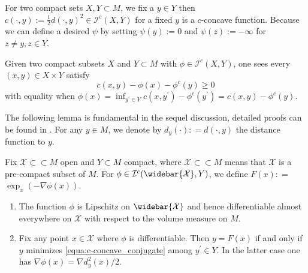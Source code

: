 \begin{example}
	\label{example:square_distance_c-concave}
	For two compact sets $X,Y \subset M$, we fix a $y \in Y$ then
	$c(\cdot, y):=\frac{1}{2}d(\cdot,y)^2 \in \mathcal{I}^c (X,Y)$ for a fixed $y$ is a $c$-concave function.
	Because we can define a desired $\psi$ by setting $\psi (y) := 0$ and $\psi (z) := - \infty$ for $ z \neq y, z \in Y$.
\end{example}

Given two compact subsets \( X \) and \( Y \subset M \) with \( \phi \in \mathcal { I } ^ { c } ( X , Y ) \),
one sees every \( ( x , y ) \in X \times Y \) satisfy
\begin{equation}
	\label{equa:c-concave_conjugate}
	c ( x , y ) - \phi ( x ) - \phi ^ { c } ( y ) \geq 0
\end{equation}
with equality when \( \phi ( x ) = \inf _ { y ^ { \prime } \in Y } c \left( x , y ^ { \prime } \right) - \phi ^ { c } \left( y ^ { \prime } \right) = c ( x , y ) - \phi ^ { c } ( y ) . \)

The following lemma \cite[Lemma 3.2]{cordero2001riemannian} is fundamental in the sequel discussion,
detailed proofs can be found in \cite[Lemmas 2 and 7]{mccann2001polar}.
For any \( y \in M \), we denote by \( d _ { y } ( \cdot ) : = d ( \cdot , y ) \)
the distance function to \( y \).
\begin{lem}
	\label{lem:minimizer_differentiable}
	Fix \( \mathcal{X} \subset \subset M \) open and \( Y \subset M \) compact,
	where $ \mathcal{X} \subset \subset M $ means that $\mathcal{X}$ is a pre-compact subset of $M$.
	For \( \phi \in \mathcal{I} ^ { c } ( \widebar { \mathcal{X} } , Y ) \), we define \( F ( x ) : = \)
	\( \exp _ { x } ( - \nabla \phi ( x ) ) \).
	\begin{enumerate}
		\item The function \( \phi \) is Lipschitz on \( \widebar { \mathcal{X} } \) and
		      hence differentiable almost everywhere on \( \mathcal{X} \) with respect to the volume measure on $M$.
		\item Fix any point \( x \in  \mathcal{X} \) where \( \phi \) is differentiable. Then \( y = F ( x ) \) if and
		      only if \( y \) minimizes \cref{equa:c-concave_conjugate} among \( y ^ { \prime } \in Y . \) In the latter case one has
		      \( \nabla \phi ( x ) = \nabla d _ { y } ^ { 2 } ( x ) / 2 \).
	\end{enumerate}
\end{lem}

